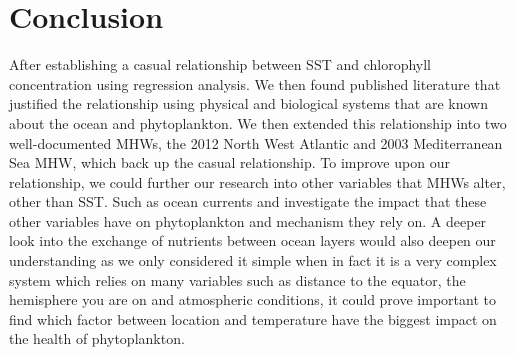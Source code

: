 \section{Conclusion}

After establishing a casual relationship between SST and chlorophyll concentration using regression analysis. We then found published literature that justified the relationship using physical and biological systems that are known about the ocean and phytoplankton. We then extended this relationship into two well-documented MHWs, the 2012 North West Atlantic and 2003 Mediterranean Sea MHW, which back up the casual relationship. To improve upon our relationship, we could further our research into other variables that MHWs alter, other than SST. Such as ocean currents and investigate the impact that these other variables have on phytoplankton and mechanism they rely on. A deeper look into the exchange of nutrients between ocean layers would also deepen our understanding as we only considered it simple when in fact it is a very complex system which relies on many variables such as distance to the equator, the hemisphere you are on and atmospheric conditions, it could prove important to find which factor between location and temperature have the biggest impact on the health of phytoplankton. 